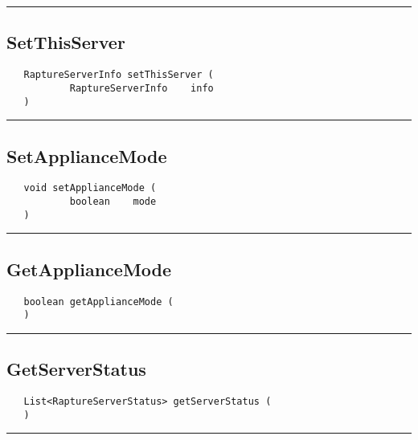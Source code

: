 \rule{15cm}{2pt}
\subsection{SetThisServer}
\label{Api:SetThisServer}
\begin{verbatim}
   RaptureServerInfo setThisServer (
           RaptureServerInfo    info
   )
\end{verbatim}



\rule{15cm}{2pt}
\subsection{SetApplianceMode}
\label{Api:SetApplianceMode}
\begin{verbatim}
   void setApplianceMode (
           boolean    mode
   )
\end{verbatim}



\rule{15cm}{2pt}
\subsection{GetApplianceMode}
\label{Api:GetApplianceMode}
\begin{verbatim}
   boolean getApplianceMode (
   )
\end{verbatim}



\rule{15cm}{2pt}
\subsection{GetServerStatus}
\label{Api:GetServerStatus}
\begin{verbatim}
   List<RaptureServerStatus> getServerStatus (
   )
\end{verbatim}



\rule{15cm}{2pt}
